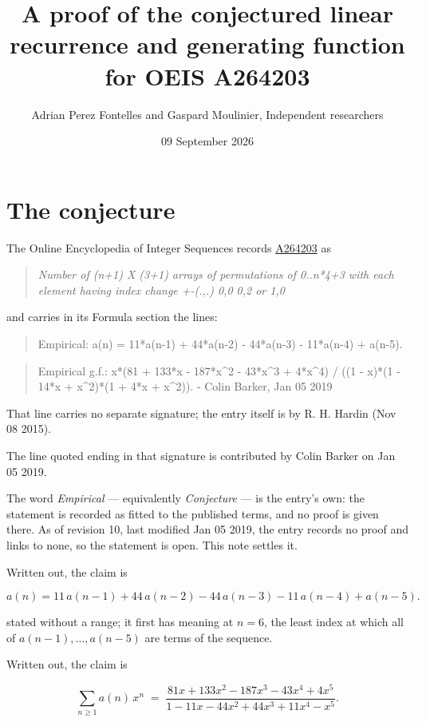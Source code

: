 \documentclass[11pt]{article}
\title{A proof of the conjectured linear recurrence and generating function for OEIS A264203}
\author{Adrian Perez Fontelles and Gaspard Moulinier, Independent researchers}
\date{09 September 2026}
\theoremstyle{definition}
\begin{document}
\maketitle
\section{The conjecture}

The Online Encyclopedia of Integer Sequences records \href{https://oeis.org/A264203}{A264203} as

\begin{quote}\itshape Number of (n+1) X (3+1) arrays of permutations of 0..n*4+3 with each element having index change +-(.,.) 0,0 0,2 or 1,0\end{quote}

and carries in its Formula section the lines:

\begin{quote}\ttfamily Empirical: a(n) = 11*a(n-1) + 44*a(n-2) - 44*a(n-3) - 11*a(n-4) + a(n-5).\end{quote}

\begin{quote}\ttfamily Empirical g.f.: x*(81 + 133*x - 187*x\textasciicircum{}2 - 43*x\textasciicircum{}3 + 4*x\textasciicircum{}4) / ((1 - x)*(1 - 14*x + x\textasciicircum{}2)*(1 + 4*x + x\textasciicircum{}2)). - Colin Barker, Jan 05 2019\end{quote}

That line carries no separate signature; the entry itself is by R. H. Hardin (Nov 08 2015).

The line quoted ending in that signature is contributed by Colin Barker on Jan 05 2019.

The word {\itshape Empirical} --- equivalently {\itshape Conjecture} --- is the entry's own: the statement is recorded as fitted to the published terms, and no proof is given there. As of revision 10, last modified Jan 05 2019, the entry records no proof and links to none, so the statement is open. This note settles it.

Written out, the claim is

\[a(n) = 11\,a(n-1) + 44\,a(n-2) - 44\,a(n-3) - 11\,a(n-4) + a(n-5).\]

stated without a range; it first has meaning at $n = 6$, the least index at which all of $a(n-1),\dots,a(n-5)$ are terms of the sequence.

Written out, the claim is

\[\sum_{n \ge 1} a(n)\,x^n \;=\; \frac{81x + 133x^{2} - 187x^{3} - 43x^{4} + 4x^{5}}{1 - 11x - 44x^{2} + 44x^{3} + 11x^{4} - x^{5}}.\]
\end{document}
